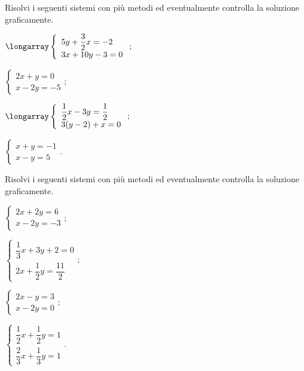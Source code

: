 \begin{esercizio}[\Ast]
 \label{ese:19.73}
 Risolvi i seguenti sistemi con più metodi ed eventualmente controlla
la soluzione graficamente.
\begin{multicols}{2}
\begin{enumeratea}
\item $\longarray\left\{\begin{array}{l}5y+\dfrac{3}{2}x=-2\\3x+10y-3=0 \end{array}\right.;$
\item $\left\{\begin{array}{l}{2x+y=0}\\{x-2y=-5}\end{array}\right.;$
\item $\longarray\left\{\begin{array}{l}\dfrac{1}{2}x-3y=\dfrac{1}{2}\\3(y-2)+x=0 \end{array}\right.;$
\item $\left\{\begin{array}{l}{x+y=-1}\\{x-y=5}\end{array}\right..$
\end{enumeratea}
\end{multicols}
\end{esercizio}
\pagebreak
\begin{esercizio}[\Ast]
 \label{ese:19.74}
 Risolvi i seguenti sistemi con più metodi ed eventualmente controlla
la soluzione graficamente.
\begin{multicols}{2}
\begin{enumeratea}
\item $\left\{\begin{array}{l}{2x+2y=6}\\{x-2y=-3}\end{array}\right.;$
\item $\left\{\begin{array}{l}{\dfrac{1}{3}x+3y+2=0}\\{2x+\dfrac{1}{2}y=\dfrac{11}{2}}\end{array}\right.;$
\item $\left\{\begin{array}{l}{2x-y=3}\\{x-2y=0}\end{array}\right.;$
\item $\left\{\begin{array}{l}{\dfrac{1}{2}x+\dfrac{1}{2}y=1}\\{\dfrac{2}{3}x+\dfrac{1}{3}y=1}\end{array}\right..$
\end{enumeratea}
\end{multicols}
\end{esercizio}

